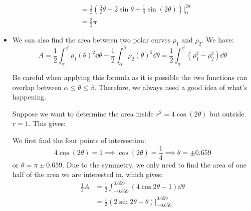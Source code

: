 \begin{itemize}
\begin{example}
\begin{align}
            &= \frac{1}{2}\left(\frac{3}{2}\theta - 2\sin\theta + \frac{1}{4}\sin(2\theta) \right)\Biggr|^{2\pi}_{0} \\ 
            &= \frac{3}{2}\pi
        \end{align}
    \end{example}
    \item We can also find the area between two polar curves $\rho_1$ and $\rho_2$. We have:
    \begin{equation}
        A = \frac{1}{2}\int_\alpha^\beta \rho_1(\theta)^2 \dd{\theta} - \frac{1}{2}\int_\alpha^\beta \rho_2(\theta)^2 \dd{\theta} = \frac{1}{2}\int_\alpha^\beta (\rho_1^2-\rho_2^2)\dd{\theta}
    \end{equation}
    \begin{warning}
        Be careful when applying this formula as it is possible the two functions can overlap between $\alpha \le \theta \le \beta$. Therefore, we always need a good idea of what's happening.
    \end{warning}
    \begin{example}
        Suppose we want to determine the area inside $r^2 = 4\cos(2\theta)$ but outside $r=1$. This gives:
        \begin{center}
        \end{center}
        We first find the four points of intersection:
        \begin{equation}
            4\cos(2\theta)=1 \implies \cos (2\theta) = \frac{1}{4} \implies \theta = \pm 0.659
        \end{equation}
        or $\theta = \pi \pm 0.659$. Due to the symmetry, we only need to find the area of one half of the area we are interested in, which gives:
        \begin{align}
            \frac{1}{2}A &= \frac{1}{2}\int_{-0.659}^{0.659}(4\cos 2\theta - 1) \dd{\theta} \\ 
            &= \frac{1}{2}(2\sin 2\theta - \theta)\Big|^{0.659}_{-0.659} \\

\end{align}
\end{example}
\end{itemize}
